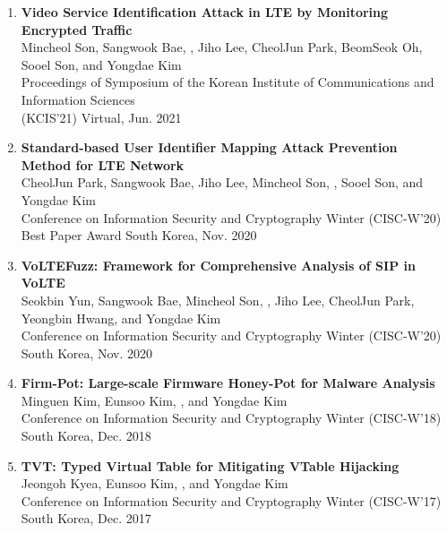 \begin{enumerate}[leftmargin=1.5em]
    \item \textbf{Video Service Identification Attack in LTE by Monitoring Encrypted Traffic} \\
        {\small
            Mincheol Son, Sangwook Bae, , Jiho Lee, CheolJun Park, BeomSeok Oh, Sooel Son, and Yongdae Kim \\
            Proceedings of Symposium of the Korean Institute of Communications and Information Sciences \\ (KCIS'21)
        }
        \hfill {\small Virtual, Jun. 2021}
    
    \item \textbf{Standard-based User Identifier Mapping Attack Prevention Method for LTE Network} \\
        {\small
            CheolJun Park, Sangwook Bae, Jiho Lee, Mincheol Son, ,
            Sooel Son, and Yongdae Kim \\
            Conference on Information Security and Cryptography Winter (CISC-W’20) \\
            Best Paper Award
        }
        \hfill {\small South Korea, Nov. 2020}

    \item \textbf{VoLTEFuzz: Framework for Comprehensive Analysis of SIP in VoLTE} \\
        {\small
            Seokbin Yun, Sangwook Bae, Mincheol Son, , Jiho Lee, CheolJun Park, Yeongbin Hwang, and Yongdae Kim \\
            Conference on Information Security and Cryptography Winter (CISC-W’20)
        }
        \hfill {\small South Korea, Nov. 2020}
        
    \item \textbf{Firm-Pot: Large-scale Firmware Honey-Pot for Malware Analysis} \\
        {\small
            Minguen Kim, Eunsoo Kim, , and Yongdae Kim \\
            Conference on Information Security and Cryptography Winter (CISC-W’18)
        }
        \hfill {\small South Korea, Dec. 2018}
        
    \item \textbf{TVT: Typed Virtual Table for Mitigating VTable Hijacking} \\
        {\small
            Jeongoh Kyea, Eunsoo Kim, , and Yongdae Kim \\
            Conference on Information Security and Cryptography Winter (CISC-W’17)
        }
        \hfill {\small South Korea, Dec. 2017}
        

\end{enumerate}
